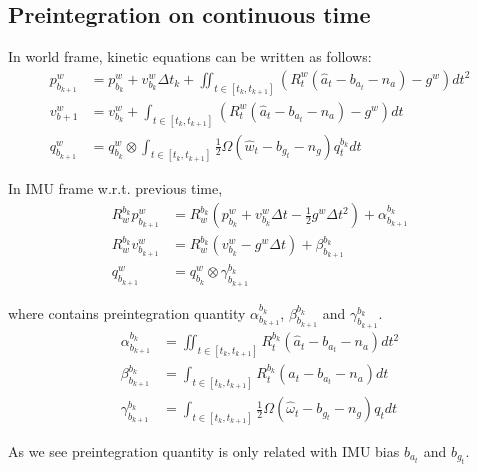 \subsection{Preintegration on continuous time}
In world frame, kinetic equations can be written as follows:
\begin{equation}
	\begin{split}
		p_{b_{k+1}}^w & = p_{b_k}^w + v_{b_k}^w \Delta t_k +\iint_{t\in [t_k,t_{k+1}]} (R^w_t(\hat{a}_t-b_{a_t}-n_a)-g^w) dt^2 \\
		v_{b+1}^w & = v_{b_k}^w + \int_{t\in [t_k,t_{k+1}]} (R^w_t(\hat{a}_t-b_{a_t}-n_a)-g^w) dt \\
		q_{b_{k+1}}^w & = q_{b_k}^w \otimes \int_{t\in [t_k,t_{k+1}]} \frac{1}{2} \Omega(\hat{w}_t-b_{g_t}-n_g)q_t^{b_k} dt
	\end{split}
\end{equation}
\par In IMU frame w.r.t. previous time,
\begin{equation} \label{eq:vins-preintegration}
	\begin{split}
		R_w^{b_k}p_{b_{k+1}}^w &= R_w^{b_k}( p_{b_k}^w + v_{b_k}^w\Delta{t} - \frac12g^w\Delta{t}^2) + \alpha_{b_{k+1}}^{b_k} \\
		R_w^{b_k}v_{b_{k+1}}^w &= R_w^{b_k}( v_{b_k}^w - g^w\Delta{t} ) + \beta_{b_{k+1}}^{b_k} \\
		q_{b_{k+1}}^w &= q_{b_k}^w \otimes \gamma_{b_{k+1}}^{b_k}
	\end{split}
\end{equation}
\par where contains preintegration quantity $\alpha_{b_{k+1}}^{b_k}$, $\beta_{b_{k+1}}^{b_k}$ and $\gamma_{b_{k+1}}^{b_k}$.
\begin{equation}
	\begin{split}
		\alpha_{b_{k+1}}^{b_k} &= \iint_{t\in[t_k,t_{k+1}]}R_t^{b_k}(\hat{a}_t-b_{a_t}-n_a)dt^2 \\
		\beta_{b_{k+1}}^{b_k} &= \int_{t\in[t_k,t_{k+1}]}R_t^{b_k}(\hat{a}_t-b_{a_t}-n_a)dt \\
		\gamma_{b_{k+1}}^{b_k} &= \int_{t\in[t_k,t_{k+1}]}\frac12\Omega(\hat{\omega}_t-b_{g_t}-n_g)q_tdt
	\end{split}
\end{equation}
\par As we see preintegration quantity is only related with IMU bias $b_{a_t}$ and $b_{g_t}$.

